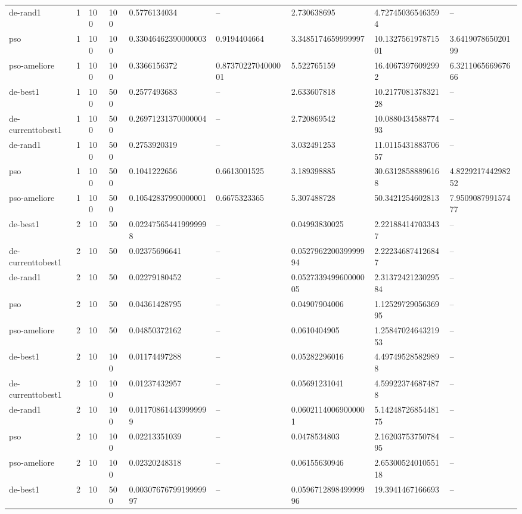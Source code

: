\begin{table}[t]
\begin{tabular}{lllllllll}
de-rand1 & 1 & 100 & 100 & 0.5776134034 & -- & 2.730638695 & 4.727450365463594 & -- \\
pso & 1 & 100 & 100 & 0.33046462390000003 & 0.9194404664 & 3.3485174659999997 & 10.132756197871501 & 3.641907865020199 \\
pso-ameliore & 1 & 100 & 100 & 0.3366156372 & 0.8737022704000001 & 5.522765159 & 16.40673976092992 & 6.321106566967666 \\
de-best1 & 1 & 100 & 500 & 0.2577493683 & -- & 2.633607818 & 10.217708137832128 & -- \\
de-currenttobest1 & 1 & 100 & 500 & 0.26971231370000004 & -- & 2.720869542 & 10.088043458877493 & -- \\
de-rand1 & 1 & 100 & 500 & 0.2753920319 & -- & 3.032491253 & 11.011543188370657 & -- \\
pso & 1 & 100 & 500 & 0.1041222656 & 0.6613001525 & 3.189398885 & 30.63128588896168 & 4.822921744298252 \\
pso-ameliore & 1 & 100 & 500 & 0.10542837990000001 & 0.6675323365 & 5.307488728 & 50.3421254602813 & 7.950908799157477 \\
de-best1 & 2 & 10 & 50 & 0.022475654419999998 & -- & 0.04993830025 & 2.221884147033437 & -- \\
de-currenttobest1 & 2 & 10 & 50 & 0.02375696641 & -- & 0.052796220039999994 & 2.222346874126847 & -- \\
de-rand1 & 2 & 10 & 50 & 0.02279180452 & -- & 0.052733949960000005 & 2.3137242123029584 & -- \\
pso & 2 & 10 & 50 & 0.04361428795 & -- & 0.04907904006 & 1.1252972905636995 & -- \\
pso-ameliore & 2 & 10 & 50 & 0.04850372162 & -- & 0.0610404905 & 1.2584702464321953 & -- \\
de-best1 & 2 & 10 & 100 & 0.01174497288 & -- & 0.05282296016 & 4.497495285829898 & -- \\
de-currenttobest1 & 2 & 10 & 100 & 0.01237432957 & -- & 0.05691231041 & 4.599223746874878 & -- \\
de-rand1 & 2 & 10 & 100 & 0.011708614439999999 & -- & 0.06021140069000001 & 5.1424872685448175 & -- \\
pso & 2 & 10 & 100 & 0.02213351039 & -- & 0.0478534803 & 2.1620375375078495 & -- \\
pso-ameliore & 2 & 10 & 100 & 0.02320248318 & -- & 0.06155630946 & 2.6530052401055118 & -- \\
de-best1 & 2 & 10 & 500 & 0.0030767679919999997 & -- & 0.059671289849999996 & 19.3941467166693 & -- \\

\end{tabular}
\end{table}
